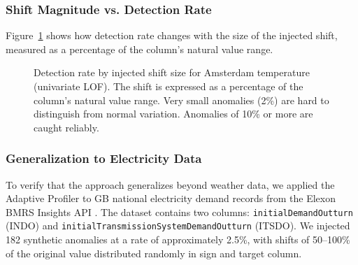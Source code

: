 \documentclass[12pt]{article}
\begin{document}
\subsubsection{Shift Magnitude vs. Detection Rate}

Figure~\ref{fig:shift} shows how detection rate changes with the size of the injected shift, measured as a percentage of the column's natural value range.

\begin{figure}[!htbp]
\begin{center}
\end{center}
\caption{Detection rate by injected shift size for Amsterdam temperature (univariate LOF). The shift is expressed as a percentage of the column's natural value range. Very small anomalies (2\%) are hard to distinguish from normal variation. Anomalies of 10\% or more are caught reliably.}
\label{fig:shift}
\end{figure}

\subsubsection{Generalization to Electricity Data}
\label{sec:elec_generalization}

To verify that the approach generalizes beyond weather data, we applied the Adaptive Profiler to GB national electricity demand records from the Elexon BMRS Insights API \cite{elexonbmrs2026}. The dataset contains two columns: \texttt{initialDemandOutturn} (INDO) and \texttt{initialTransmissionSystem\allowbreak DemandOutturn} (ITSDO). We injected 182 synthetic anomalies at a rate of approximately 2.5\%, with shifts of 50--100\% of the original value distributed randomly in sign and target column.
\end{document}
